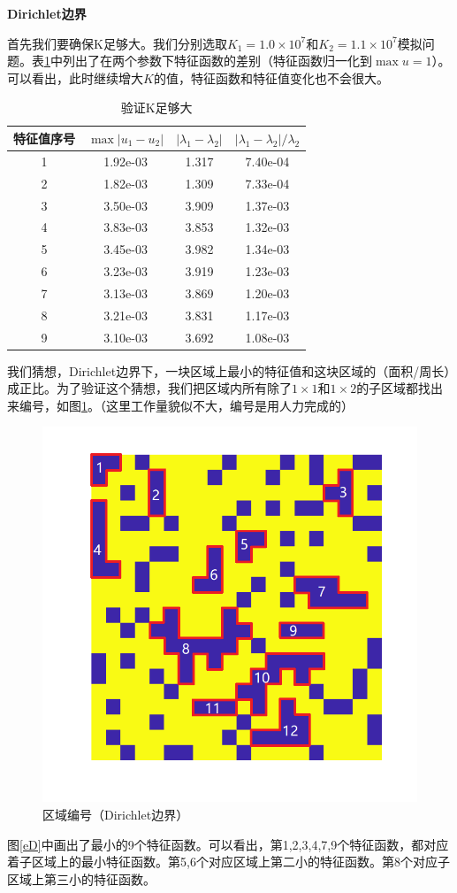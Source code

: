 \documentclass[12pt,a4paper]{article}
\begin{document}
\textbf{Dirichlet边界}

首先我们要确保K足够大。我们分别选取$K_1=1.0 \times 10^7$和$K_2=1.1 \times 10^7$模拟问题。表\ref{kD}中列出了在两个参数下特征函数的差别（特征函数归一化到$\max u = 1$）。可以看出，此时继续增大$K$的值，特征函数和特征值变化也不会很大。

\begin{table}
\centering
\begin{tabular}{c|c|c|c}
\hline
特征值序号 & $\max |u_1 - u_2|$ & $|\lambda_1 - \lambda_2|$ & $|\lambda_1 - \lambda_2| / \lambda_2$ \\
\hline
1 & 1.92e-03 & 1.317 & 7.40e-04 \\
2 & 1.82e-03 & 1.309 & 7.33e-04 \\
3 & 3.50e-03 & 3.909 & 1.37e-03 \\
4 & 3.83e-03 & 3.853 & 1.32e-03 \\
5 & 3.45e-03 & 3.982 & 1.34e-03 \\
6 & 3.23e-03 & 3.919 & 1.23e-03 \\
7 & 3.13e-03 & 3.869 & 1.20e-03 \\
8 & 3.21e-03 & 3.831 & 1.17e-03 \\
9 & 3.10e-03 & 3.692 & 1.08e-03 \\
\hline 
\end{tabular}
\caption{验证K足够大}
\label{kD}
\end{table}

我们猜想，Dirichlet边界下，一块区域上最小的特征值和这块区域的（面积/周长）成正比。为了验证这个猜想，我们把区域内所有除了$1\times1$和$1\times2$的子区域都找出来编号，如图\ref{rD}。（这里工作量貌似不大，编号是用人力完成的）

\begin{figure}[htbp]
\centering
\includegraphics[width=0.4\linewidth]{locate/edVD}
\caption{区域编号（Dirichlet边界）}
\label{rD}
\end{figure}

图\ref{eD}中画出了最小的9个特征函数。可以看出，第1,2,3,4,7,9个特征函数，都对应着子区域上的最小特征函数。第5,6个对应区域上第二小的特征函数。第8个对应子区域上第三小的特征函数。
\end{document}
